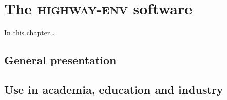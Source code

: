 
\chapter{The \textsc{highway-env} software}

\label{chapter:a}

\abstractStartChapter{}%
In this chapter\dots
\minitocStartChapter{}

\section{General presentation}
\section{Use in academia, education and industry}